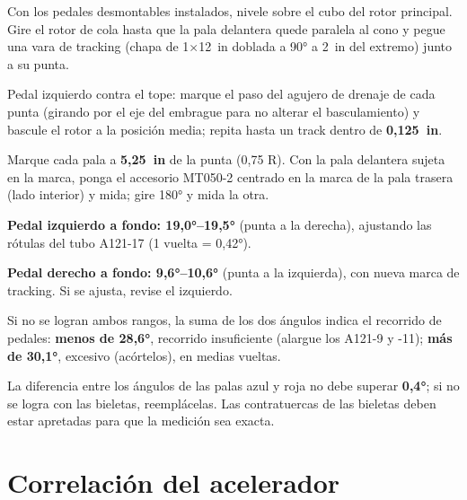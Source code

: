 \begin{pasos}
\item Con los pedales desmontables instalados, nivele sobre el cubo del rotor principal. Gire el rotor de cola hasta que la pala delantera quede paralela al cono y pegue una vara de tracking (chapa de 1$\times$12~in doblada a 90° a 2~in del extremo) junto a su punta.
\item Pedal izquierdo contra el tope: marque el paso del agujero de drenaje de cada punta (girando por el eje del embrague para no alterar el basculamiento) y bascule el rotor a la posición media; repita hasta un track dentro de \textbf{0,125~in}.
\item Marque cada pala a \textbf{5,25~in} de la punta (0,75 R). Con la pala delantera sujeta en la marca, ponga el accesorio MT050-2 centrado en la marca de la pala trasera (lado interior) y mida; gire 180° y mida la otra.
\item \textbf{Pedal izquierdo a fondo: 19,0°--19,5°} (punta a la derecha), ajustando las rótulas del tubo A121-17 (1 vuelta = 0,42°).
\item \textbf{Pedal derecho a fondo: 9,6°--10,6°} (punta a la izquierda), con nueva marca de tracking. Si se ajusta, revise el izquierdo.
\item Si no se logran ambos rangos, la suma de los dos ángulos indica el recorrido de pedales: \textbf{menos de 28,6°}, recorrido insuficiente (alargue los A121-9 y -11); \textbf{más de 30,1°}, excesivo (acórtelos), en medias vueltas.
\end{pasos}

\begin{precaucion}
La diferencia entre los ángulos de las palas azul y roja no debe superar \textbf{0,4°}; si no se logra con las bieletas, reemplácelas. Las contratuercas de las bieletas deben estar apretadas para que la medición sea exacta.
\end{precaucion}

\section{Correlación del acelerador}


